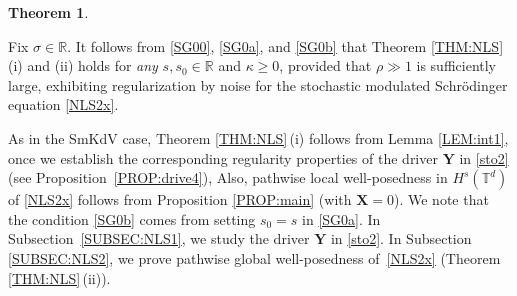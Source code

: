 \documentclass[letterpaper, 11pt,  reqno]{amsart}
\newtheorem{theorem}{Theorem} [section]
\newcommand{\1}{\hspace{0.5mm}\textup{I}\hspace{0.5mm}}
\newcommand{\noi}{\noindent}
\newcommand{\R}{\mathbb{R}}
\newcommand{\T}{\mathbb{T}}
\newcommand{\Dl}{\Delta}
\newcommand{\kk}{\kappa}
\newcommand{\s}{\sigma}
\newcommand{\XX}{\mathbf{X}}
\newcommand{\YY}{\mathbf{Y}}
\numberwithin{equation}{section}
\numberwithin{theorem}{section}
\begin{document}
\begin{theorem}
%
%
%
%
%
%



\end{theorem}



Fix $\s \in \R$.
It follows from 
\eqref{SG00}, 
\eqref{SG0a},  and 
\eqref{SG0b} that 
Theorem \ref{THM:NLS}\,(i)
and (ii) 
holds
for {\it any} $s, s_0 \in \R$ and $\kk \ge 0$, 
provided that $\rho  \gg1$
is sufficiently large, 
exhibiting regularization by noise
for the stochastic modulated Schr\"odinger equation \eqref{NLS2x}.



As in the SmKdV case, 
Theorem \ref{THM:NLS}\,(i) 
 follows 
from Lemma \ref{LEM:int1}, 
once we establish
the corresponding  regularity properties
of the driver $\YY$  in \eqref{sto2} (see Proposition~\ref{PROP:drive4}), 
Also, pathwise 
local well-posedness in $H^s(\T^d)$ 
of \eqref{NLS2x} 
follows from 
Proposition \ref{PROP:main}
(with $\XX = 0$).
We note that the condition \eqref{SG0b}
comes from setting $s_0 = s$ in \eqref{SG0a}.
In Subsection~\ref{SUBSEC:NLS1}, 
we study the driver $\YY$ in \eqref{sto2}.
In Subsection 
\ref{SUBSEC:NLS2},
we prove pathwise global well-posedness of~\eqref{NLS2x}
(Theorem \ref{THM:NLS}\,(ii)). 
\end{document}
